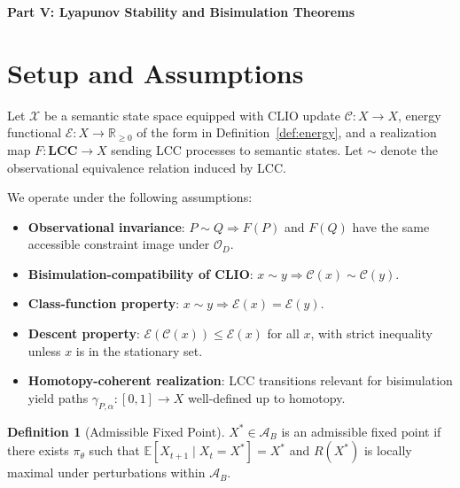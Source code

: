\documentclass[11pt, letterpaper]{article}
\theoremstyle{plain}
\theoremstyle{definition}
\newtheorem{definition}[theorem]{Definition}
\theoremstyle{remark}
\newcommand{\CC}{\mathcal{C}}
\newcommand{\EE}{\mathcal{E}}
\newcommand{\OO}{\mathcal{O}}
\newcommand{\Adm}{\mathcal{A}}
\begin{document}

\vspace{1.2em}
\begin{center}{\large\bfseries Part V: Lyapunov Stability and Bisimulation Theorems}\end{center}
\vspace{0.5em}

\section{Setup and Assumptions}

Let $\mathcal{X}$ be a semantic state space equipped with CLIO update $\CC : X \to X$,
energy functional $\EE : X \to \mathbb{R}_{\geq 0}$ of the form in
Definition~\ref{def:energy}, and a realization map $F : \mathbf{LCC} \to X$ sending
LCC processes to semantic states. Let $\sim$ denote the observational equivalence
relation induced by LCC.

We operate under the following assumptions:
\begin{itemize}[noitemsep]
  \item[(A1)] \textbf{Observational invariance}: $P \sim Q \Rightarrow F(P)$ and $F(Q)$
    have the same accessible constraint image under $\OO_D$.
  \item[(A2)] \textbf{Bisimulation-compatibility of CLIO}: $x \sim y \Rightarrow
    \CC(x) \sim \CC(y)$.
  \item[(A3)] \textbf{Class-function property}: $x \sim y \Rightarrow \EE(x) = \EE(y)$.
  \item[(A4)] \textbf{Descent property}: $\EE(\CC(x)) \leq \EE(x)$ for all $x$,
    with strict inequality unless $x$ is in the stationary set.
  \item[(A5)] \textbf{Homotopy-coherent realization}: LCC transitions relevant for
    bisimulation yield paths $\gamma_{P,\alpha}: [0,1] \to X$ well-defined up to homotopy.
\end{itemize}

\begin{definition}[Admissible Fixed Point]
$X^* \in \Adm_B$ is an admissible fixed point if there exists $\pi_\theta$ such that
$\mathbb{E}[X_{t+1} \mid X_t = X^*] = X^*$ and $R(X^*)$ is locally maximal under
perturbations within $\Adm_B$.
\end{definition}
\end{document}
